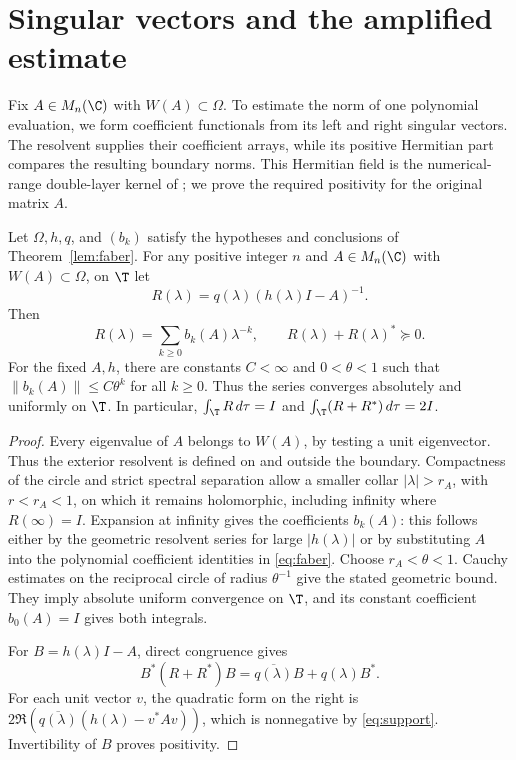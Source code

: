\section{Singular vectors and the amplified estimate}\label{sec:matrix}
Fix $A\in M_n(\C)$ with $W(A)\subset\Omega$.
To estimate the norm of one polynomial evaluation, we form coefficient
functionals from its left and right singular vectors. The resolvent supplies
their coefficient arrays, while its positive Hermitian part compares the
resulting boundary norms. This Hermitian field is the numerical-range double-layer kernel of
\cite{DelyonDelyon1999,CrouzeixPalencia2017}; we prove the required
positivity for the original matrix $A$.

\begin{theorem}\label{lem:resolvent}
Let $\Omega,h,q$, and $(b_k)$ satisfy the hypotheses and conclusions of Theorem~\ref{lem:faber}. For any positive integer $n$ and $A\in M_n(\C)$ with $W(A)\subset\Omega$, on $\T$ let
\begin{equation}\label{eq:R}
 R(\lambda)=q(\lambda)(h(\lambda)I-A)^{-1}.
\end{equation}
Then
\[
 R(\lambda)=\sum_{k\ge0}b_k(A)\lambda^{-k},\qquad R(\lambda)+R(\lambda)^*\succeq0.
\]
For the fixed $A,h$, there are constants $C<\infty$ and $0<\theta<1$
such that $\|b_k(A)\|\le C\theta^k$ for all $k\ge0$. Thus the series
converges absolutely and uniformly on $\T$. In particular,
$\int_\T R\,d\tau=I$ and $\int_\T(R+R^*)\,d\tau=2I$.
\end{theorem}
\begin{proof}
Every eigenvalue of $A$ belongs to $W(A)$, by testing a unit eigenvector. Thus the exterior resolvent is defined on and outside the boundary. Compactness of the circle and strict spectral separation allow a smaller collar $|\lambda|>r_A$, with $r<r_A<1$, on which it remains holomorphic, including infinity where $R(\infty)=I$. Expansion at infinity gives the coefficients $b_k(A)$: this follows either by the geometric resolvent series for large $|h(\lambda)|$ or by substituting $A$ into the polynomial coefficient identities in \eqref{eq:faber}. Choose $r_A<\theta<1$. Cauchy estimates on the reciprocal circle of
radius $\theta^{-1}$ give the stated geometric bound. They imply
absolute uniform convergence on $\T$, and its constant coefficient
$b_0(A)=I$ gives both integrals.

For $B=h(\lambda)I-A$, direct congruence gives
\[
 B^*(R+R^*)B=\overline{q(\lambda)}B+q(\lambda)B^*.
\]
For each unit vector $v$, the quadratic form on the right is
$2\Re(\overline{q(\lambda)}(h(\lambda)-v^*Av))$, which is nonnegative by \eqref{eq:support}. Invertibility of $B$ proves positivity.
\end{proof}


